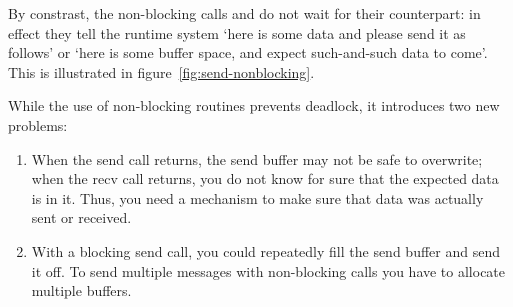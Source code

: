 By constrast, the non-blocking calls  and 
do not wait for their counterpart: in effect they tell the runtime
system `here is some data and please send it as follows' or `here is
some buffer space, and expect such-and-such data to
come'. 
This is illustrated in figure~\ref{fig:send-nonblocking}.

While the use of non-blocking routines prevents deadlock, it
introduces two new problems:
\begin{enumerate}
\item When the send call returns, the send buffer may not be safe to
  overwrite; when the recv call returns, you do not know for sure that
  the expected data is in it. Thus, you need a mechanism to make sure
  that data was actually sent or received.
\item With a blocking send call, you could repeatedly fill the send
  buffer and send it off. To send multiple messages with non-blocking calls
  you have to allocate multiple buffers.
\end{enumerate}

